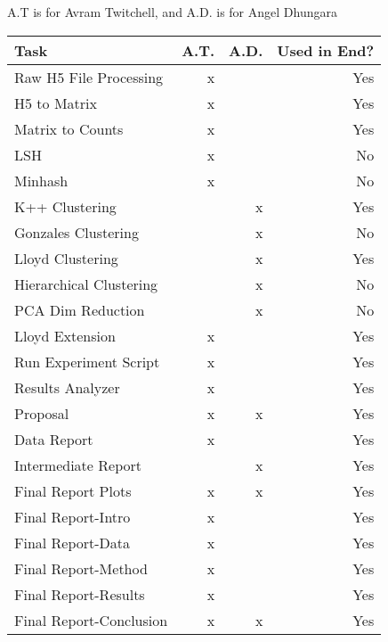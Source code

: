A.T is for Avram Twitchell, and A.D. is for Angel Dhungara

\begin{center}
\begin{tabular}{|l|r|r|r|} \hline
    Task                   & A.T.  & A.D.& Used in End? \\ \hline
    Raw H5 File Processing & x     &     & Yes          \\ 
    H5 to Matrix           & x     &     & Yes          \\
    Matrix to Counts       & x     &     & Yes          \\
    LSH                    & x     &     & No           \\
    Minhash                & x     &     & No           \\
    K++ Clustering         &       & x   & Yes          \\
    Gonzales Clustering    &       & x   & No           \\
    Lloyd Clustering       &       & x   & Yes          \\
    Hierarchical Clustering&       & x   & No           \\
    PCA Dim Reduction      &       & x   & No           \\
    Lloyd Extension        & x     &     & Yes          \\
    Run Experiment Script  & x     &     & Yes          \\
    Results Analyzer       & x     &     & Yes          \\
    Proposal               & x     & x   & Yes          \\
    Data Report            & x     &     & Yes          \\
    Intermediate Report    &       & x   & Yes          \\ 
    Final Report Plots     & x     & x   & Yes          \\
    Final Report-Intro     & x     &     & Yes          \\
    Final Report-Data      & x     &     & Yes          \\
    Final Report-Method    & x     &     & Yes          \\
    Final Report-Results   & x     &     & Yes          \\
    Final Report-Conclusion& x     & x   & Yes          \\ \hline
\end{tabular}
\end{center}
